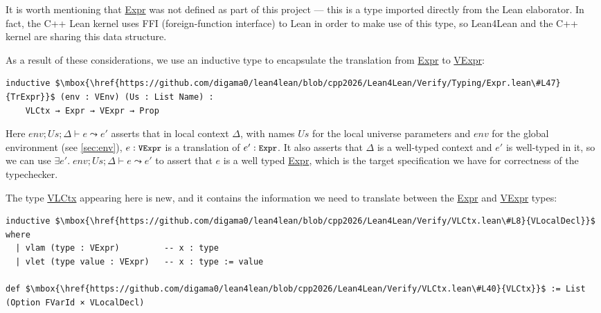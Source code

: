 \documentclass[sigplan,10pt,screen]{acmart}\settopmatter{printfolios=true,printccs=false,printacmref=false}
\newcommand{\lfl}{\textsf{Lean4Lean}\xspace}
\newcommand{\code}[1]{\mbox{\ttfamily\small #1}}
\begin{document}
It is worth mentioning that \href{https://github.com/leanprover/lean4/blob/v4.20.1/src/Lean/Expr.lean#L301}{\code{Expr}} was not defined as part of this project --- this is a type imported directly from the Lean elaborator. In fact, the C++ Lean kernel uses FFI (foreign-function interface) to Lean in order to make use of this type, so \lfl and the C++ kernel are sharing this data structure.

As a result of these considerations, we use an inductive type to encapsulate the translation from \href{https://github.com/leanprover/lean4/blob/v4.20.1/src/Lean/Expr.lean#L301}{\code{Expr}} to \href{https://github.com/digama0/lean4lean/blob/cpp2026/Lean4Lean/Theory/VExpr.lean#L6}{\code{VExpr}}:
\begin{lstlisting}
inductive $\mbox{\href{https://github.com/digama0/lean4lean/blob/cpp2026/Lean4Lean/Verify/Typing/Expr.lean\#L47}{TrExpr}}$ (env : VEnv) (Us : List Name) :
    VLCtx → Expr → VExpr → Prop
\end{lstlisting}
Here $\mathit{env};\mathit{Us};\Delta\vdash e\leadsto e'$ asserts that in local context $\Delta$, with names $\mathit{Us}$ for the local universe parameters and $\mathit{env}$ for the global environment (see \autoref{sec:env}), $e:\code{VExpr}$ is a translation of $e':\code{Expr}$. It also asserts that $\Delta$ is a well-typed context and $e'$ is well-typed in it, so we can use $\exists e'.\;\mathit{env};\mathit{Us};\Delta\vdash e\leadsto e'$ to assert that $e$ is a well typed \href{https://github.com/leanprover/lean4/blob/v4.20.1/src/Lean/Expr.lean#L301}{\code{Expr}}, which is the target specification we have for correctness of the typechecker.

The type \href{https://github.com/digama0/lean4lean/blob/cpp2026/Lean4Lean/Verify/VLCtx.lean#L40}{\code{VLCtx}} appearing here is new, and it contains the information we need to translate between the \href{https://github.com/leanprover/lean4/blob/v4.20.1/src/Lean/Expr.lean#L301}{\code{Expr}} and \href{https://github.com/digama0/lean4lean/blob/cpp2026/Lean4Lean/Theory/VExpr.lean#L6}{\code{VExpr}} types:

\begin{lstlisting}
inductive $\mbox{\href{https://github.com/digama0/lean4lean/blob/cpp2026/Lean4Lean/Verify/VLCtx.lean\#L8}{VLocalDecl}}$ where
  | vlam (type : VExpr)         -- x : type
  | vlet (type value : VExpr)   -- x : type := value

def $\mbox{\href{https://github.com/digama0/lean4lean/blob/cpp2026/Lean4Lean/Verify/VLCtx.lean\#L40}{VLCtx}}$ := List (Option FVarId × VLocalDecl)
\end{lstlisting}
\end{document}
